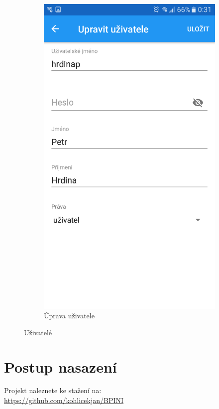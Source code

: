 \documentclass[12pt]{report}
\begin{document}
\begin{figure}[H]
\begin{subfigure}[b]{0.3\textwidth}
	\includegraphics[width=\textwidth]{../images/client_android/Screenshot_20170612-003127.png}	
	\caption{Úprava uživatele}
	\label{fig:Screenshot_20170612-003127}
  \end{subfigure}
  \caption{Uživatelé}
\end{figure}


\chapter{Postup nasazení}
Projekt naleznete ke stažení na: \\ \url{https://github.com/kohlicekjan/BPINI} 
\end{document}
